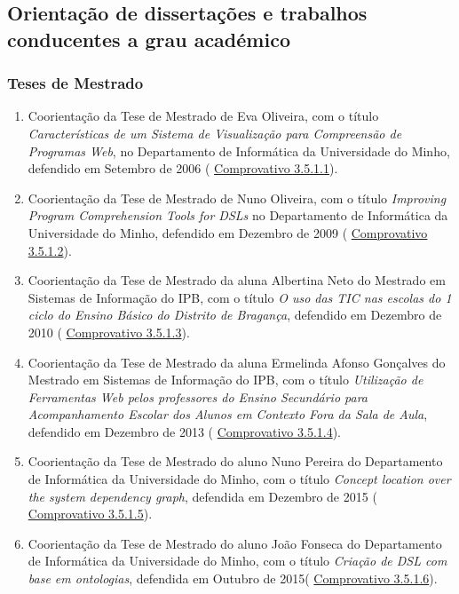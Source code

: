 \documentclass[11pt]{article}
\begin{document}
\subsection{Orientação de dissertações e trabalhos conducentes a grau académico}
\subsubsection{Teses de Mestrado}
\begin{enumerate}
\item{Coorientação da Tese de Mestrado de Eva Oliveira, com o título 
\emph{Características de um Sistema de Visualização para Compreensão de Programas Web}, no Departamento de Informática da Universidade do Minho, defendido em Setembro de 2006 (
\href{run:CoOrientTrabalhos/OrientacaoEva.pdf}{Comprovativo 3.5.1.1}).}
\item{Coorientação da Tese de Mestrado de Nuno Oliveira, com o título 
\emph{Improving Program Comprehension Tools for DSLs} no Departamento de Informática da Universidade do Minho, defendido em Dezembro de 2009 (
\href{run:CoOrientTrabalhos/NunoOliveira.pdf}{Comprovativo 3.5.1.2}).}
\item{Coorientação da Tese de Mestrado da aluna Albertina Neto do Mestrado em Sistemas de Informação do IPB, com o título 
\emph{O uso das TIC nas escolas do 1
\º ciclo do Ensino Básico do Distrito de Bragança}, defendido em Dezembro de 2010 (
\href{run:CoOrientTrabalhos/TesesMSI.pdf}{Comprovativo 3.5.1.3}).}
\item{Coorientação da Tese de Mestrado da aluna Ermelinda Afonso Gonçalves do Mestrado em Sistemas de Informação do IPB, com o título 
\emph{Utilização de Ferramentas Web pelos professores do Ensino Secundário para Acompanhamento Escolar dos Alunos em Contexto Fora da Sala de Aula}, defendido em Dezembro de 2013 (
\href{run:CoOrientTrabalhos/TesesMSI.pdf}{Comprovativo 3.5.1.4}).}
\item{Coorientação da Tese de Mestrado do aluno Nuno Pereira do Departamento de Informática da Universidade do Minho, com o título {
\em{ Concept location over the system dependency graph}}, defendida em Dezembro de 2015 (
\href{run:CoOrientTrabalhos/OrientNunoPereira.pdf}{Comprovativo 3.5.1.5}).}
\item{Coorientação da Tese de Mestrado do aluno João Fonseca do Departamento de Informática da Universidade do Minho, com o título {
\em{ Criação de DSL com base em ontologias}}, defendida em Outubro de 2015(
\href{run:CoOrientTrabalhos/OrientJoaoFonseca.pdf}{Comprovativo 3.5.1.6}).}

\end{enumerate}
\end{document}
